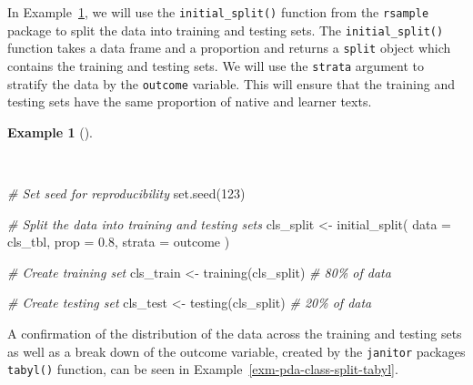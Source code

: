 \documentclass[
  letterpaper,
]{latex/krantz}
\newenvironment{Shaded}{\begin{snugshade}}{\end{snugshade}}
\newcommand{\AttributeTok}[1]{\textcolor[rgb]{0.00,0.00,0.00}{#1}}
\newcommand{\CommentTok}[1]{\textcolor[rgb]{0.00,0.00,0.00}{\textit{#1}}}
\newcommand{\DecValTok}[1]{\textcolor[rgb]{0.00,0.00,0.00}{#1}}
\newcommand{\FloatTok}[1]{\textcolor[rgb]{0.00,0.00,0.00}{#1}}
\newcommand{\FunctionTok}[1]{\textcolor[rgb]{0.00,0.00,0.00}{#1}}
\newcommand{\NormalTok}[1]{\textcolor[rgb]{0.00,0.00,0.00}{#1}}
\newcommand{\OtherTok}[1]{\textcolor[rgb]{0.00,0.00,0.00}{#1}}
\theoremstyle{definition}
\newtheorem{example}{Example}[chapter]
\theoremstyle{remark}
\begin{document}
In Example~\ref{exm-pda-class-split}, we will use the
\texttt{initial\_split()} function from the \texttt{rsample} package to
split the data into training and testing sets. The
\texttt{initial\_split()} function takes a data frame and a proportion
and returns a \texttt{split} object which contains the training and
testing sets. We will use the \texttt{strata} argument to stratify the
data by the \texttt{outcome} variable. This will ensure that the
training and testing sets have the same proportion of native and learner
texts.

\begin{example}[]\protect\hypertarget{exm-pda-class-split}{}\label{exm-pda-class-split}

~

\begin{Shaded}
\begin{Highlighting}[]
\CommentTok{\# Set seed for reproducibility}
\FunctionTok{set.seed}\NormalTok{(}\DecValTok{123}\NormalTok{)}

\CommentTok{\# Split the data into training and testing sets}
\NormalTok{cls\_split }\OtherTok{\textless{}{-}}
  \FunctionTok{initial\_split}\NormalTok{(}
    \AttributeTok{data =}\NormalTok{ cls\_tbl,}
    \AttributeTok{prop =} \FloatTok{0.8}\NormalTok{,}
    \AttributeTok{strata =}\NormalTok{ outcome}
\NormalTok{  )}

\CommentTok{\# Create training set}
\NormalTok{cls\_train }\OtherTok{\textless{}{-}} \FunctionTok{training}\NormalTok{(cls\_split)  }\CommentTok{\# 80\% of data}

\CommentTok{\# Create testing set}
\NormalTok{cls\_test }\OtherTok{\textless{}{-}} \FunctionTok{testing}\NormalTok{(cls\_split)    }\CommentTok{\# 20\% of data}
\end{Highlighting}
\end{Shaded}

\end{example}

A confirmation of the distribution of the data across the training and
testing sets as well as a break down of the outcome variable, created by
the \texttt{janitor} packages \texttt{tabyl()} function, can be seen in
Example~\ref{exm-pda-class-split-tabyl}.
\end{document}
